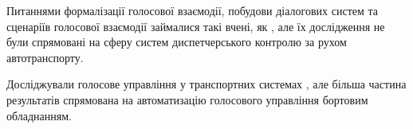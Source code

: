 %
%
%
%
%

Питаннями формалізації голосової взаємодії, побудови діалогових систем та сценаріїв голосової взаємодії займалися такі вчені, як , але їх дослідження не були спрямовані на сферу систем диспетчерського контролю за рухом автотранспорту. 

Досліджували голосове управління у транспортних системах , але більша частина результатів спрямована на автоматизацію голосового управління бортовим обладнанням.

